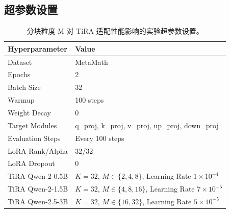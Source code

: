 \documentclass[UTF8,a4paper,11pt]{ctexart}
\begin{document}
\subsection{超参数设置}
\label{app:ablation_hyperparams}

\begin{table}[H]
\centering
\caption{分块粒度 M 对 TiRA 适配性能影响的实验超参数设置。}
\begin{tabular}{ll}
\toprule
Hyperparameter & Value \\
\midrule
Dataset & MetaMath \\
Epochs & 2 \\
Batch Size & 32 \\
Warmup & 100 steps \\
Weight Decay & 0 \\
Target Modules & q\_proj, k\_proj, v\_proj, up\_proj, down\_proj \\
Evaluation Steps & Every 100 steps \\
\midrule
LoRA Rank/Alpha & 32/32 \\
LoRA Dropout & 0 \\
\midrule
TiRA Qwen-2-0.5B & $K=32$, $M\in\{2,4,8\}$, Learning Rate $1\times10^{-4}$ \\
TiRA Qwen-2-1.5B & $K=32$, $M\in\{4,8,16\}$, Learning Rate $7\times10^{-5}$ \\
TiRA Qwen-2.5-3B & $K=32$, $M\in\{16,32\}$, Learning Rate $5\times10^{-5}$ \\
\bottomrule
\end{tabular}
\end{table}
\end{document}
